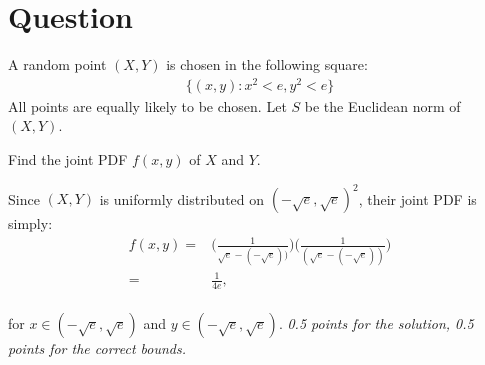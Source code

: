 \section*{Question}

A random point $(X,Y)$ is chosen in the following square:
\begin{align*}
    \{(x, y) : x^2 < e,  y^2 < e \}
\end{align*}
All points are equally likely to be chosen. Let $S$ be the Euclidean norm of $(X,Y)$.
\begin{exercise}[1]
Find the joint PDF $f(x,y)$ of $X$ and $Y$.
\begin{solution}
Since $(X,Y)$ is uniformly distributed on $(-\sqrt{e}, \sqrt{e})^2$, their joint PDF is simply:
\begin{align*}
    f(x,y) =& \Big(\frac{1}{\sqrt{e} - (-\sqrt{e}))} \Big) \Big(\frac{1}{(\sqrt{e} - (-\sqrt{e}))} \Big) \\
    =& \frac{1}{4e},
\end{align*}\\
for $x\in (-\sqrt{e}, \sqrt{e})$ and $y\in (-\sqrt{e}, \sqrt{e})$.
\textit{0.5 points for the solution, 0.5 points for the correct bounds.}
\end{solution}
\end{exercise}


